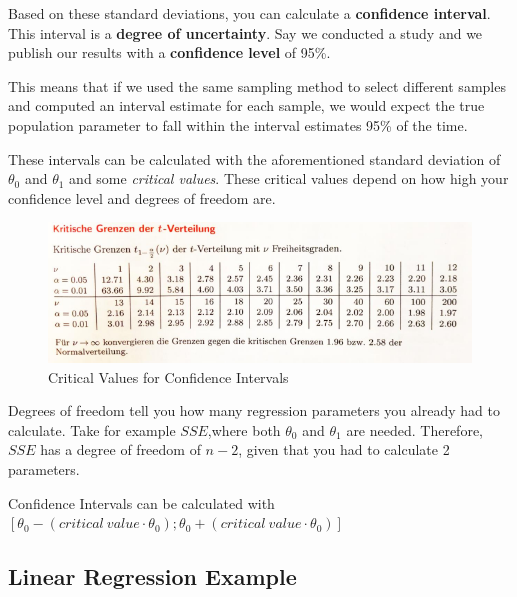 \documentclass[a4paper, 11pt]{article}
\begin{document}
\vspace{10px}

Based on these standard deviations, you can calculate a \textbf{confidence interval}. This interval is a \textbf{degree of uncertainty}. Say we conducted a study and we publish our results with a \textbf{confidence level} of 95\%.

This means that if we used the same sampling method to select different samples and computed an interval estimate for each sample, we would expect the true population parameter to fall within the interval estimates 95\% of the time.

\vspace{10px}

These intervals can be calculated with the aforementioned standard deviation of $\theta^{}_{0}$ and $\theta^{}_{1}$ and some \textit{critical values}. These critical values depend on how high your confidence level and degrees of freedom are. 

\begin{figure}[htb!]
    \centering
    \includegraphics[keepaspectratio=true, width=\linewidth]{CriticalBordersTInterval.png}
    \caption{Critical Values for Confidence Intervals}
    \label{fig:critical_values}
\end{figure}


Degrees of freedom tell you how many regression parameters you already had to calculate. Take for example $SSE$,where both $\theta^{}_{0}$ and $\theta^{}_{1}$ are needed. Therefore, $SSE$ has a degree of freedom of $n-2$, given that you had to calculate 2 parameters.

\vspace{10px}

\noindent Confidence Intervals can be calculated with $[\theta_0 - (critical\ value \cdot \theta_0);\theta_0 + (critical\ value \cdot \theta_0)]$


\newpage

\subsection{Linear Regression Example}
\end{document}
